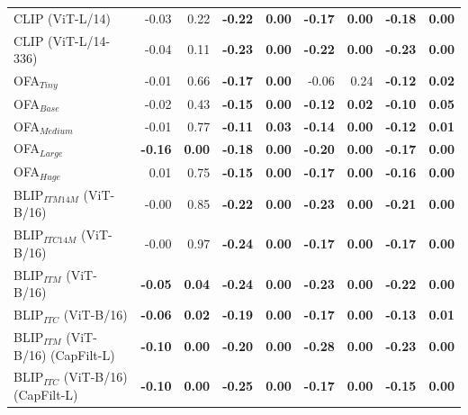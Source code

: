 \begin{table}[ht]
\begin{adjustbox}{max width=\textwidth}
\begin{tabular}{l|rr|rrrrrr}
 CLIP (ViT-L/14)                     & -0.03          & 0.22          & \textbf{-0.22} & \textbf{0.00} & \textbf{-0.17} & \textbf{0.00} & \textbf{-0.18} & \textbf{0.00} \\
 CLIP (ViT-L/14-336)                 & -0.04          & 0.11          & \textbf{-0.23} & \textbf{0.00} & \textbf{-0.22} & \textbf{0.00} & \textbf{-0.23} & \textbf{0.00} \\
 OFA$_{Tiny}$                        & -0.01          & 0.66          & \textbf{-0.17} & \textbf{0.00} & -0.06          & 0.24          & \textbf{-0.12} & \textbf{0.02} \\
 OFA$_{Base}$                        & -0.02          & 0.43          & \textbf{-0.15} & \textbf{0.00} & \textbf{-0.12} & \textbf{0.02} & \textbf{-0.10} & \textbf{0.05} \\
 OFA$_{Medium}$                      & -0.01          & 0.77          & \textbf{-0.11} & \textbf{0.03} & \textbf{-0.14} & \textbf{0.00} & \textbf{-0.12} & \textbf{0.01} \\
 OFA$_{Large}$                       & \textbf{-0.16} & \textbf{0.00} & \textbf{-0.18} & \textbf{0.00} & \textbf{-0.20} & \textbf{0.00} & \textbf{-0.17} & \textbf{0.00} \\
 OFA$_{Huge}$                        & 0.01           & 0.75          & \textbf{-0.15} & \textbf{0.00} & \textbf{-0.17} & \textbf{0.00} & \textbf{-0.16} & \textbf{0.00} \\
 BLIP$_{ITM 14M}$ (ViT-B/16)         & -0.00          & 0.85          & \textbf{-0.22} & \textbf{0.00} & \textbf{-0.23} & \textbf{0.00} & \textbf{-0.21} & \textbf{0.00} \\
 BLIP$_{ITC 14M}$ (ViT-B/16)         & -0.00          & 0.97          & \textbf{-0.24} & \textbf{0.00} & \textbf{-0.17} & \textbf{0.00} & \textbf{-0.17} & \textbf{0.00} \\
 BLIP$_{ITM}$ (ViT-B/16)             & \textbf{-0.05} & \textbf{0.04} & \textbf{-0.24} & \textbf{0.00} & \textbf{-0.23} & \textbf{0.00} & \textbf{-0.22} & \textbf{0.00} \\
 BLIP$_{ITC}$ (ViT-B/16)             & \textbf{-0.06} & \textbf{0.02} & \textbf{-0.19} & \textbf{0.00} & \textbf{-0.17} & \textbf{0.00} & \textbf{-0.13} & \textbf{0.01} \\
 BLIP$_{ITM}$ (ViT-B/16) (CapFilt-L) & \textbf{-0.10} & \textbf{0.00} & \textbf{-0.20} & \textbf{0.00} & \textbf{-0.28} & \textbf{0.00} & \textbf{-0.23} & \textbf{0.00} \\
 BLIP$_{ITC}$ (ViT-B/16) (CapFilt-L) & \textbf{-0.10} & \textbf{0.00} & \textbf{-0.25} & \textbf{0.00} & \textbf{-0.17} & \textbf{0.00} & \textbf{-0.15} & \textbf{0.00} \\

\end{tabular}
\end{adjustbox}
\end{table}
